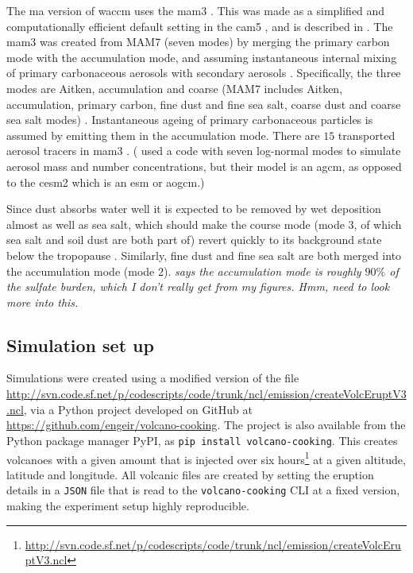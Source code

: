 \documentclass[twocol]{ametsocV5}
\begin{document}
The \acrshort{ma} version of \acrshort{waccm} uses the \acrfull{mam3}
\citep{gettleman2019}. This was made as a simplified and computationally efficient
default setting in the \acrshort{cam5} \citep{liu2016}, and is described in
\citet{liu2012}. The \acrshort{mam3} was created from MAM7 (seven modes) by merging the
primary carbon mode with the accumulation mode, and assuming instantaneous internal
mixing of primary carbonaceous aerosols with secondary aerosols \citep{liu2016}.
Specifically, the three modes are Aitken, accumulation and coarse (MAM7 includes Aitken,
accumulation, primary carbon, fine dust and fine sea salt, coarse dust and coarse sea
salt modes) \citep{liu2016}. Instantaneous ageing of primary carbonaceous particles is
assumed by emitting them in the accumulation mode. There are \(15\) transported aerosol
tracers in \acrshort{mam3} \citep{liu2016}. (\citet{marshall2019, marshall2020,
  marshall2021} used a code with seven log-normal modes to simulate aerosol mass and
number concentrations, but their model is an \acrfull{agcm}, as opposed to the
\acrshort{cesm2} which is an \acrfull{esm} or \acrfull{aogcm}.)

Since dust absorbs water well it is expected to be removed by wet deposition almost as
well as sea salt, which should make the course mode (mode 3, of which sea salt and soil
dust are both part of) revert quickly to its background state below the tropopause
\citep{liu2012}. Similarly, fine dust and fine sea salt are both merged into the
accumulation mode (mode 2). \emph{\citet{liu2012} says the accumulation mode is roughly
  $90\%$ of the sulfate burden, which I don't really get from my figures. Hmm, need to
  look more into this.}


\subsection{Simulation set up}

Simulations were created using a modified version of the file
\url{http://svn.code.sf.net/p/codescripts/code/trunk/ncl/emission/createVolcEruptV3.ncl},
via a Python project developed on GitHub at
\url{https://github.com/engeir/volcano-cooking}. The project is also available from the
Python package manager PyPI, as \texttt{pip install volcano-cooking}. This creates
volcanoes with a given  amount that is injected over six
hours\footnote{\url{http://svn.code.sf.net/p/codescripts/code/trunk/ncl/emission/createVolcEruptV3.ncl}}
at a given altitude, latitude and longitude. All volcanic  files are created by
setting the eruption details in a \texttt{JSON} file that is read to the
\texttt{volcano-cooking} CLI at a fixed version, making the experiment setup highly
reproducible.
\end{document}
